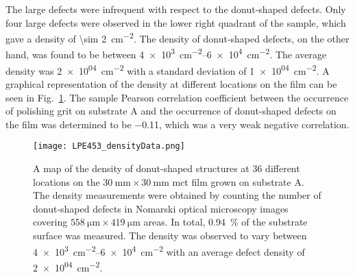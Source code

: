 The large defects were infrequent with respect to the donut-shaped defects. Only four large defects were observed in the lower right quadrant of the sample, which gave a density of \SI{\sim 2}{\centi\metre^{-2}}. The density of donut-shaped defects, on the other hand, was found to be between \SIrange{4e+3}{6e+4}{\centi\metre^{-2}}. The average density was \SI{2e+04}{\centi\metre^{-2}} with a standard deviation of \SI{1e+04}{\centi\metre^{-2}}. A graphical representation of the density at different locations on the film can be seen in Fig.~\ref{fig:LPE453_densityData}. The sample Pearson correlation coefficient between the occurrence of polishing grit on substrate A and the occurrence of donut-shaped defects on the film was determined to be \SI{-0.11}{}, which was a very weak negative correlation.


\begin{figure}[htbp]
    \centering
    \texttt{[image: LPE453\_densityData.png]}
    \caption[Map of the density of donut-shaped structures on the \ac{mct} film grown on substrate A.]{A map of the density of donut-shaped structures at 36 different locations on the $\SI{30}{\milli\metre}\times\SI{30}{\milli\metre}$ \ac{mct} film grown on substrate A. The density measurements were obtained by counting the number of donut-shaped defects in Nomarski optical microscopy images covering $\SI{558}{\micro\metre}\times\SI{419}{\micro\metre}$ areas. In total, \SI{0.94}{\percent} of the substrate surface was measured. The density was observed to vary between \SIrange{4e+3}{6e+4}{\centi\metre^{-2}} with an average defect density of \SI{2e+04}{\centi\metre^{-2}}.}
    \label{fig:LPE453_densityData}
\end{figure}





